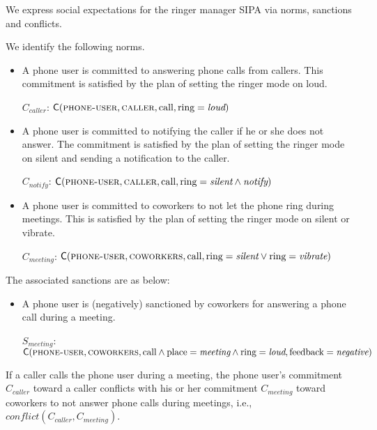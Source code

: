 \documentclass[11pt,          %
               phd,           %
               onehalfspacing %
               ]{ncsuthesis}
\newcommand{\fsc}{\textsc}
\newcommand{\msf}{\mathsf}
\newcommand{\C}{\msf{C}}
\begin{document}
We express social expectations for the ringer manager SIPA via norms,
sanctions and conflicts.
\begin{description}[leftmargin=1em]
\item[Norms.] We identify the following norms.
  \begin{itemize}[leftmargin=1em]
  \item A phone user is committed to answering phone calls from
  callers. This commitment is satisfied by the plan of setting the 
  ringer mode on loud.

  $C_{caller}$: $\C(\fsc{phone-user},\fsc{caller}, \text{call}, \text{ring}=\textit{loud})$

  \item A phone user is committed to notifying the caller if he or she does
  not answer. The commitment is satisfied by the plan of setting the
  ringer mode on silent and sending a notification to the caller.
  
  $C_{notify}$: $\C(\fsc{phone-user},\fsc{caller}, \text{call},\\ 
  \text{ring}= \textit{silent}   \land \textit{notify})$
    
  \item A phone user is committed to coworkers to not let the phone ring 
  during meetings.
  This is satisfied by the plan of setting the ringer mode on 
  silent or vibrate. 

  $C_{meeting}$: $\C(\fsc{phone-user},\fsc{coworkers}, \text{call},\\ 
  \text{ring}= \textit{silent} \lor \text{ring} = \textit{vibrate})$
  \end{itemize}
  
\item[Sanctions.] The associated sanctions are as below: 
  \begin{itemize}[leftmargin=1em]
  \item A phone user is (negatively) sanctioned by coworkers for 
  answering a phone call during a meeting. 
  
    $S_{meeting}$: $\C(\fsc{phone-user},\fsc{coworkers}, \text{call} \\
    \land \text{place}=\textit{meeting} \land \text{ring}=\textit{loud}, \text{feedback}=\textit{negative})$
  \end{itemize}
  
  \item[Conflicts.] If a caller calls the phone user during a meeting, the phone 
  user's commitment $C_{caller}$ toward a caller conflicts with his or her 
  commitment $C_{meeting}$ toward coworkers to not answer phone calls 
  during meetings, i.e., \\$\mathit{conflict}(C_{caller}, C_{meeting})$.
    
\end{description}
\end{document}
